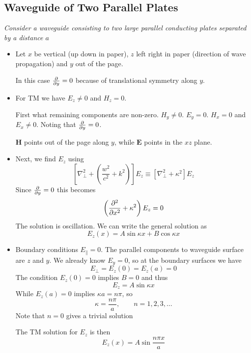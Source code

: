 \documentclass[11pt, a4paper]{article}
\renewcommand{\vec}[1]{\bm{#1}} %
\newcommand{\E}{\vec{E}}  %
\renewcommand{\H}{\vec{H}}  %
\renewcommand{\laplacian}{\nabla^{2}}
\begin{document}
\subsection{Waveguide of Two Parallel Plates}
\textit{Consider a waveguide consisting to two large parallel conducting plates separated by a distance $ a $}
\begin{itemize}
	\item Let $ x $ be vertical (up down in paper), $ z $ left right in paper (direction of wave propagation) and $ y $ out of the page. 
	
	In this case $ \pdv{y} = 0 $ because of translational symmetry along $ y $. 
	
	\item For TM we have $ E_{z} \neq 0 $ and $ H_{z} = 0 $. 
	
	First what remaining components are non-zero. $ H_{y} \neq 0 $. $ E_{y} = 0 $. $ H_{x} = 0 $ and $ E_{x} \neq 0 $. Noting that $ \pdv{y} = 0 $. 
	
	$ \H $ points out of the page along $ y $, while $ \E $ points in the $ xz $ plane.
	
	\item Next, we find $ E_{z} $ using
	\begin{equation*}
		\left[\laplacian_{\perp} + \left(\frac{w^{2}}{c^{2}} + k^{2}\right)\right]E_{z} \equiv \left[\laplacian_{\perp} + \kappa^{2}\right]E_{z}
	\end{equation*}
	Since $ \pdv{y} = 0 $ this becomes
	\begin{equation*}
		\left(\pdv[2]{}{x} + \kappa^{2}\right)E_{z} = 0
	\end{equation*}
	The solution is oscillation. We can write the general solution as
	\begin{equation*}
		E_{z}(x) = A\sin \kappa x + B \cos \kappa x
	\end{equation*}
	
	\item Boundary conditions $ E_{\parallel} = 0 $. The parallel components to waveguide surface are $ z $ and $ y $. We already know $ E_{y} = 0 $, so at the boundary surfaces we have
	\begin{equation*}
		E_{\perp} = E_{z}(0) = E_{z}(a) = 0
	\end{equation*}
	The condition $ E_{z}(0) = 0$ implies  $ B = 0 $ and thus
	\begin{equation*}
		E_{z} = A\sin \kappa x
	\end{equation*}
	While $ E_{z}(a) = 0 $ implies $ \kappa a = n \pi $, so 
	\begin{equation*}
		\kappa = \frac{n\pi}{a}, \qquad n = 1, 2, 3, \ldots
	\end{equation*}
	Note that $ n = 0 $ gives a trivial solution
	
	The TM solution for $ E_{z} $ is then
	\begin{equation*}
		E_{z}(x) = A \sin \frac{n\pi x}{a}
	\end{equation*}
\end{itemize}
\end{document}
